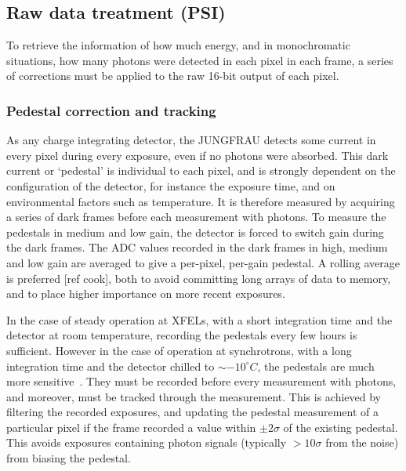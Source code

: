 \documentclass[a4paper]{article}
\begin{document}
\subsection{Raw data treatment (PSI)}

To retrieve the information of how much energy, and in monochromatic situations, how many photons were detected in each pixel in each frame, a series of corrections must be applied to the raw 16-bit output of each pixel.

\subsubsection{Pedestal correction and tracking}
As any charge integrating detector, the JUNGFRAU detects some current in every pixel during every exposure, even if no photons were absorbed. This dark current or `pedestal' is individual to each pixel, and is strongly dependent on the configuration of the detector, for instance the exposure time, and on environmental factors such as temperature. It is therefore measured by acquiring a series of dark frames before each measurement with photons. To measure the pedestals in medium and low gain, the detector is forced to switch gain during the dark frames. The ADC values recorded in the dark frames in high, medium and low gain are averaged to give a per-pixel, per-gain pedestal. A rolling average is preferred [ref cook], both to avoid committing long arrays of data to memory, and to place higher importance on more recent exposures.

In the case of steady operation at XFELs, with a short integration time and the detector at room temperature, recording the pedestals every few hours is sufficient. However in the case of operation at synchrotrons, with a long integration time and the detector chilled to $\sim{-10}^{\circ}C$, the pedestals are much more sensitive~\cite{JFoperation}. They must be recorded before every measurement with photons, and moreover, must be tracked through the measurement. This is achieved by filtering the recorded exposures, and updating the pedestal measurement of a particular pixel if the frame recorded a value within $\pm2\sigma$ of the existing pedestal. This avoids exposures containing photon signals (typically $>10\sigma$ from the noise) from biasing the pedestal.
\end{document}

